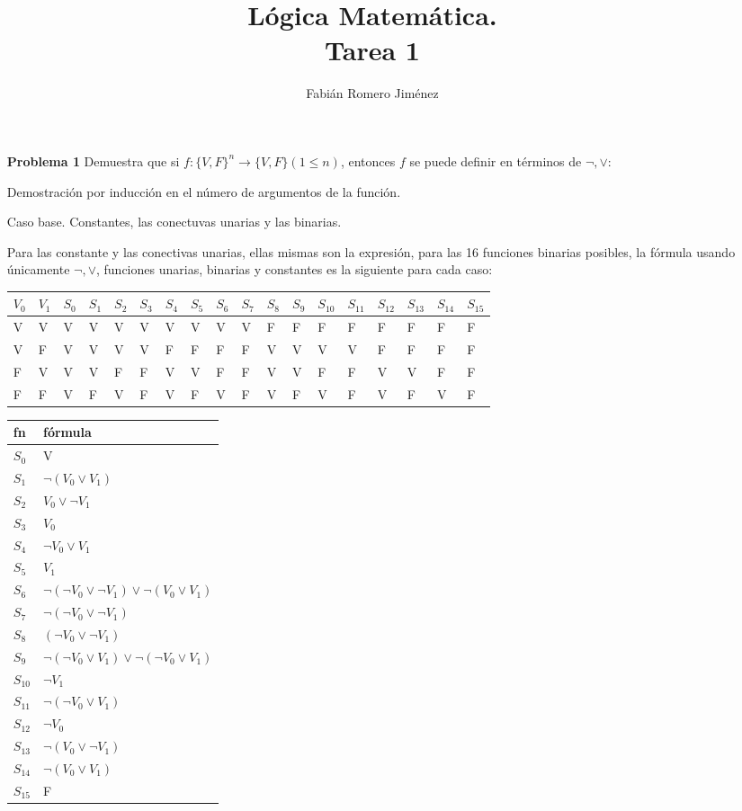 \documentclass{article}
\title{Lógica Matemática. \\Tarea 1}
\author{Fabián Romero Jiménez}
\date{}
\begin{document}
\maketitle
\begin{enumerate}

\item[\bf{Problema 1}] Demuestra que si $f:\{V, F\}^n \to \{V, F\} (1 \le n)$, entonces $f$ se puede definir en términos de $\neg,\vee$:

Demostración por inducción en el número de argumentos de la función.

Caso base. Constantes, las conectuvas unarias y las binarias.

Para las constante y las conectivas unarias, ellas mismas son la expresión, para 
las 16 funciones binarias posibles, la fórmula usando únicamente $\neg,\vee$, funciones unarias, binarias y constantes es la siguiente para cada caso: 
{\footnotesize
\begin{tabular}{ |l|l||l|l|l|l|l|l|l|l|l|l|l|l|l|l|l|l| }
\hline 
  $V_0$ & $V_1$ & $S_0$ & $S_1$ & $S_2$ & $S_3$ & $S_4$ & $S_5$ & $S_6$ & $S_7$ & $S_8$ & $S_9$ & $S_{10}$ & $S_{11}$ & $S_{12}$ & $S_{13}$ & $S_{14}$ & $S_{15}$ \\
\hline 
  V & V &  V & V &  V & V &  V & V &  V & V &  F & F &  F & F &  F & F & F & F \\ 
  V & F &  V & V &  V & V &  F & F &  F & F &  V & V &  V & V &  F & F & F & F \\ 
  F & V &  V & V &  F & F &  V & V &  F & F &  V & V &  F & F &  V & V & F & F \\ 
  F & F &  V & F &  V & F &  V & F &  V & F &  V & F &  V & F &  V & F & V & F\\
\hline 
\end{tabular}}
{\footnotesize
\begin{tabular}{ |l|l| }
\hline
  fn  & fórmula \\ 
\hline
  $S_0$ &  V\\
  $S_1$ &  $\neg (V_0 \vee V_1)$\\
  $S_2$ &  $ V_0 \vee \neg V_1$\\
  $S_3$ &  $V_0$\\
  $S_4$ &  $ \neg V_0 \vee  V_1$\\
  $S_5$ &  $V_1$\\
  $S_6$ &  $ \neg (\neg V_0 \vee \neg V_1) \vee \neg ( V_0 \vee V_1)$\\
  $S_7$ &  $\neg (\neg V_0 \vee \neg V_1)$\\
  $S_8$ &  $ (\neg V_0 \vee \neg V_1)$\\
  $S_9$ &  $ \neg (\neg V_0 \vee V_1) \vee \neg ( \neg V_0 \vee V_1)$ \\
  $S_{10}$ &  $\neg V_1$\\
  $S_{11}$ &  $\neg (\neg V_0 \vee V_1)$\\
  $S_{12}$ &  $\neg V_0$\\
  $S_{13}$ &  $\neg ( V_0 \vee \neg V_1)$\\
  $S_{14}$ &  $\neg (V_0 \vee V_1)$\\
  $S_{15}$ &  F\\
\hline 
\end{tabular}}


\end{enumerate}
\end{document}
